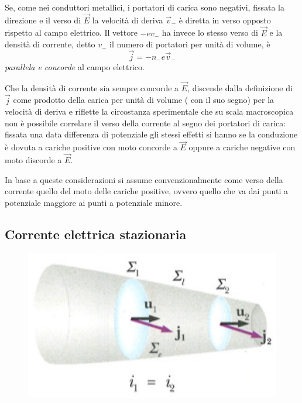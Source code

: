 \documentclass[class=book, crop=false, oneside, 12pt]{standalone}
\begin{document}
Se, come nei conduttori metallici, i portatori di carica sono negativi, fissata la direzione e il verso di \(\overrightarrow{E}\) la velocità di deriva \(\overrightarrow{v}_{-}\) è diretta in verso opposto rispetto al campo elettrico. 
Il vettore \(-e v_{-}\) ha invece lo stesso verso di \(\overrightarrow{E}\) e la densità di corrente, detto \(v_{-}\) il numero di portatori per unità di volume, è
\begin{equation}
    \overrightarrow{j} = -n_{-} e \overrightarrow{v}_{-}
\end{equation}
\emph{parallela e concorde } al campo elettrico.

Che la densità di corrente sia sempre concorde a \(\overrightarrow{E}\), discende dalla definizione di \(\overrightarrow{j}\) come prodotto della carica per unità di volume ( con il suo segno) per la velocità di deriva e riflette la circostanza sperimentale che su scala macroscopica non è possibile correlare il verso della corrente al segno dei portatori di carica: fissata una data differenza di potenziale gli stessi effetti si hanno se la conduzione è dovuta a cariche positive con moto concorde a \(\overrightarrow{E}\) oppure a cariche negative con moto discorde a \(\overrightarrow{E}\). 

In base a queste considerazioni si assume convenzionalmente come verso della corrente quello del moto delle cariche positive, ovvero quello che va dai punti a potenziale maggiore ai punti a potenziale minore.

\subsection{Corrente elettrica stazionaria}

\begin{figure}[h]
    \includegraphics[scale=0.6]{corrente_elettrica_stazionaria.png}
    \centering
    \caption{}
\end{figure}
\end{document}
